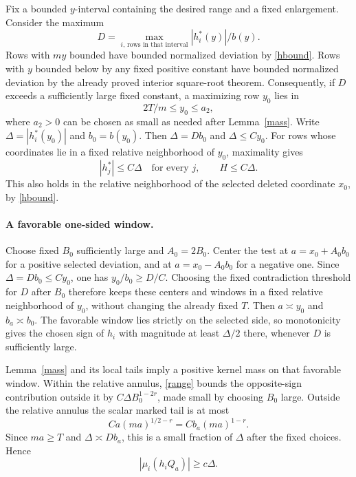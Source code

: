 \documentclass[11pt]{article}
\begin{document}
Fix a bounded $y$-interval containing the desired range and a fixed
enlargement. Consider the maximum
\[
 D=\max_{i,\,\text{rows in that interval}} |h_i^*(y)|/b(y).
\]
Rows with $my$ bounded have bounded normalized deviation by
\eqref{hbound}. Rows with $y$ bounded below by any fixed positive
constant have bounded normalized deviation by the already proved
interior square-root theorem. Consequently, if $D$ exceeds a
sufficiently large fixed constant, a maximizing row $y_0$ lies in
\[
 2T/m\le y_0\le a_2,
\]
where $a_2>0$ can be chosen as small as needed after Lemma~\ref{mass}.
Write $\Delta=|h_i^*(y_0)|$ and $b_0=b(y_0)$. Then
$\Delta=D b_0$ and $\Delta\le Cy_0$.
For rows whose coordinates lie in a fixed relative neighborhood of
$y_0$, maximality gives
\begin{equation}\label{range}
 |h_j^*|\le C\Delta\quad\text{for every }j,
 \qquad H\le C\Delta.
\end{equation}
This also holds in the relative neighborhood of the selected
deleted coordinate $x_0$, by \eqref{hbound}.

\paragraph{A favorable one-sided window.}
Choose fixed $B_0$ sufficiently large and $A_0=2B_0$.
Center the test at $a=x_0+A_0b_0$ for a positive selected deviation,
and at $a=x_0-A_0b_0$ for a negative one. Since $\Delta=D b_0\le Cy_0$, one has $y_0/b_0\ge D/C$.
Choosing the fixed contradiction threshold for $D$ after $B_0$ therefore
keeps these centers and windows in a fixed relative neighborhood of
$y_0$, without changing the already fixed $T$. Then $a\asymp y_0$ and
$b_a\asymp b_0$. The favorable window lies strictly on the selected
side, so monotonicity gives the chosen sign of $h_i$ with magnitude
at least $\Delta/2$ there, whenever $D$ is sufficiently large.

Lemma~\ref{mass} and its local tails imply a positive kernel mass
on that favorable window. Within the relative annulus,
\eqref{range} bounds the opposite-sign contribution outside it by
$C\Delta B_0^{1-2r}$, made small by choosing $B_0$ large.
Outside the relative annulus the scalar marked tail is at most
\[
 Ca(ma)^{1/2-r}=C b_a(ma)^{1-r}.
\]
Since $ma\ge T$ and $\Delta\asymp D b_a$, this is a small fraction
of $\Delta$ after the fixed choices. Hence
\begin{equation}\label{positive}
 |\mu_i(h_iQ_a)|\ge c\Delta.
\end{equation}
\end{document}

